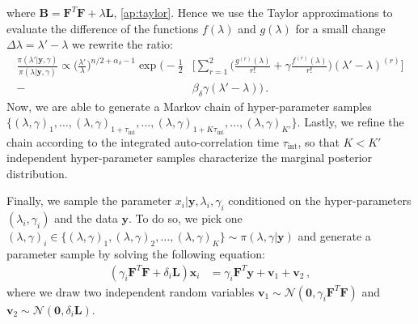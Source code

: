 where $\bm{B} = \bm{F}^T  \bm{F} + \lambda \bm{L}$, \ref{ap:taylor}.
Hence we use the Taylor approximations to evaluate the difference of the functions $f(\lambda)$ and $g(\lambda)$ for a small change $\Delta \lambda = \lambda' - \lambda$ we rewrite the ratio:
\begin{align}
    \frac{\pi(\lambda' | \bm{y}, \gamma ) }{\pi(\lambda |\bm{y},  \gamma ) } \propto \bigg(\frac{\lambda'}{\lambda}\bigg)^{n/2+\alpha_\delta -1} \exp \bigg( - \frac{1}{2}& \bigg[  \sum_{r=1}^{2} \bigg( \frac{g^{(r)}( \lambda)}{r!}  + \gamma  \frac{f^{(r)}( \lambda)}{r!}  \bigg)  (\lambda' - \lambda)^{(r)} \bigg] \\ -& \beta_\delta \gamma (\lambda' - \lambda) \bigg) \, .
\end{align}
Now, we are able to generate a Markov chain of hyper-parameter samples \newline$ \{ (\lambda, \gamma )_{1}, \dots ,(\lambda, \gamma )_{1 + \tau_{\text{int}} }, \dots ,(\lambda, \gamma )_{1+K \tau_{\text{int}} }, \dots ,(\lambda, \gamma )_{K'}\}$.
Lastly, we refine the chain according to the integrated auto-correlation time $\tau_{\text{int}}$, so that $K < K'$ independent hyper-parameter samples characterize the marginal posterior distribution.


Finally, we sample the parameter $x_i |  \bm{y}, \lambda_i, \gamma_{i} $ conditioned on the hyper-parameters $(\lambda_i, \gamma_{i})$ and the data $\bm{y}$.
To do so, we pick one $(\lambda, \gamma )_{i} \in \{(\lambda, \gamma )_{1}, (\lambda, \gamma )_{2} ,\dots ,(\lambda, \gamma )_{K}\} \sim \pi(   \lambda, \gamma | \bm{y} )$ and generate a parameter sample by solving the following equation:
\begin{align}
\label{eq:RTOapplied}
    (\gamma_i \bm{F}^T  \bm{F}+
    \delta_i \bm{L} ) \bm{x}_i &= \gamma_i \bm{F}^T \bm{y} + \bm{v}_1 + \bm{v}_2 \,  ,
\end{align}
where we draw two independent random variables $\bm{v}_1 \sim \mathcal{N}(\bm{0}, \gamma_i \bm{F}^T  \bm{F}) $ and $\bm{v}_2 \sim \mathcal{N}(\bm{0}, \delta_i \bm{L} )$.


